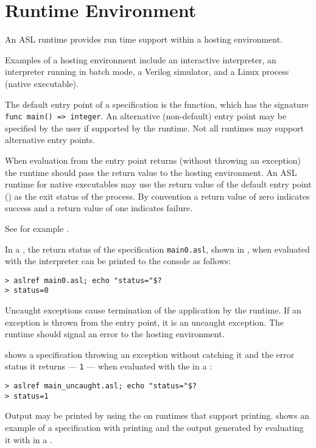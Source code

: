\chapter{Runtime Environment\label{chap:RuntimeEnvironment}}

An ASL runtime provides run time support within a hosting environment.

Examples of a hosting environment include an interactive interpreter,
an interpreter running in batch mode,
a Verilog simulator, and a Linux process (native executable).

The default entry point of a specification is the \vmain{} function, which has the signature
\verb|func main() => integer|.
An alternative (non-default) entry point may be specified by the user if
supported by the runtime. Not all runtimes may support alternative entry points.

When evaluation from the entry point returns (without
throwing an exception)
the runtime should pass the return value to the hosting environment.
%
An ASL runtime for native executables may use the return value
of the default entry point (\vmain{}) as the exit status of the process.
%
By convention a return value of zero indicates success and a return value of
one indicates failure.
%

See for example .

In a \linuxbashshell{}, the return status of the specification \texttt{main0.asl},
shown in ,
when evaluated with the \aslref{}
interpreter can be printed to the console as follows:
\begin{Verbatim}[frame=single]
> aslref main0.asl; echo "status="$?
> status=0
\end{Verbatim}


Uncaught exceptions cause termination of the application by the runtime.
If an exception is thrown from the entry point, it is an uncaught exception.
The runtime should signal an error to the hosting environment.

 shows a specification throwing an exception
without catching it and the error status it returns --- \texttt{1} ---
when evaluated with the \aslref{} in a \linuxbashshell{}:
\begin{verbatim}
> aslref main_uncaught.asl; echo "status="$?
> status=1
\end{verbatim}


Output may be printed by using the \printstatementterm{} on
runtimes that support printing.
%
 shows an example of a specification
with printing and the output generated by evaluating it with \aslref{}
in a \linuxbashshell{}.
